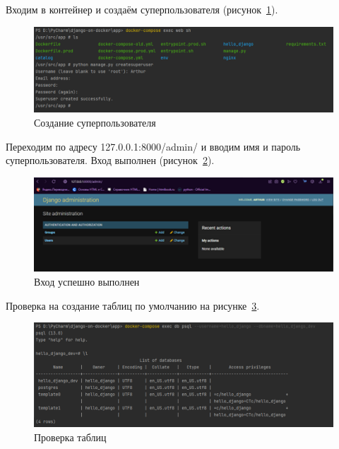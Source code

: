 Входим в контейнер и создаём суперпользователя (рисунок~\ref{rndhpcgui.2022.10.29.picture3}).
\begin{figure}[!ht]
  \centering
  \includegraphics[scale=0.8]{ResearchNotes/rndhpc_dev_gui_2022_10_29/picture3.png}
  \caption{Создание суперпользователя}
  \label{rndhpcgui.2022.10.29.picture3}
\end{figure}

Переходим по адресу \textsf{127.0.0.1:8000/admin/} и вводим имя и пароль суперпользователя. Вход выполнен (рисунок~\ref{rndhpcgui.2022.10.29.picture4}).
\begin{figure}[!ht]
  \centering
  \includegraphics[scale=0.8]{ResearchNotes/rndhpc_dev_gui_2022_10_29/picture4.png}
  \caption{Вход успешно выполнен}
  \label{rndhpcgui.2022.10.29.picture4}
\end{figure}

Проверка на создание таблиц по умолчанию на рисунке~\ref{rndhpcgui.2022.10.29.picture5}.
\begin{figure}[!ht]
  \centering
  \includegraphics[scale=0.8]{ResearchNotes/rndhpc_dev_gui_2022_10_29/picture5.png}
  \caption{Проверка таблиц}
  \label{rndhpcgui.2022.10.29.picture5}
\end{figure}
\noteattributes{}
